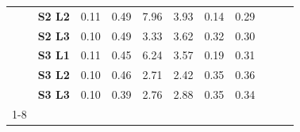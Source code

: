 \begin{table}[htb]
\begin{tabular}{@{}lllllllllll@{}}
                            & \textbf{S2 L2} & 0.11 & 0.49 & 7.96 & 3.93 & 0.14 & 0.29 \\
                            & \textbf{S2 L3} & 0.10 & 0.49 & 3.33 & 3.62 & 0.32 & 0.30 \\
                            & \textbf{S3 L1} & 0.11 & 0.45 & 6.24 & 3.57 & 0.19 & 0.31 \\
                            & \textbf{S3 L2} & 0.10 & 0.46 & 2.71 & 2.42 & 0.35 & 0.36 \\
                            & \textbf{S3 L3} & 0.10 & 0.39 & 2.76 & 2.88 & 0.35 & 0.34 \\ \cmidrule(l){1-8} 
    \end{tabular}    
\end{table}
    